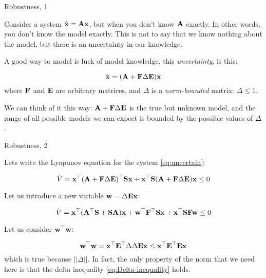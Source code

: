 \documentclass{beamer}
\begin{document}
\begin{frame}{Robustness, 1}
	\begin{flushleft}
		
		Consider a system $\dot{\mathbf{x}} = \mathbf{A}\mathbf{x}$, but when you don't know $\mathbf{A}$ exactly. In other words, you don't know the model exactly. This is not to say that we know nothing about the model, but there is an uncertainty in our knowledge.
		
		\bigskip
		
		A good way to model is luck of model knowledge, this \emph{uncertainty}, is this:
		
		\begin{equation}
			\label{eq:uncertain}
			\dot{\mathbf{x}} = (\mathbf{A} + \mathbf{F} \Delta \mathbf{E})\mathbf{x}
		\end{equation}
		where $\mathbf{F}$ and $\mathbf{E}$ are arbitrary matrices, and $\Delta$ is a \emph{norm-bounded} matrix: $\Delta \leq 1$.
		
		\bigskip
		
		We can think of it this way: $\mathbf{A} + \mathbf{F} \Delta \mathbf{E}$ is the true but unknown model, and the range of all possible models we can expect is bounded by the possible values of $\Delta$.
				
	\end{flushleft}
\end{frame}



\begin{frame}{Robustness, 2}
	\begin{flushleft}
		
		Lets write the Lyapunov equation for the system \eqref{eq:uncertain}:
		
		\begin{equation}
			\dot V = \mathbf{x}^\top 
			(\mathbf{A} + \mathbf{F} \Delta \mathbf{E})^\top\mathbf{S}\mathbf{x} + \mathbf{x}^\top\mathbf{S} (\mathbf{A} + \mathbf{F} \Delta \mathbf{E}) \mathbf{x} \leq 0
		\end{equation}
		
		Let us introduce a new variable $\mathbf{w} = \Delta \mathbf{E}\mathbf{x}$:
		
		\begin{equation}
			\label{eq:Lyapunov_xw}
			\dot V = \mathbf{x}^\top 
			(\mathbf{A}^\top \mathbf{S} + \mathbf{S}\mathbf{A}) \mathbf{x} + 
			\mathbf{w}^\top \mathbf{F}^\top\mathbf{S} \mathbf{x} +
			\mathbf{x}^\top \mathbf{S}\mathbf{F} \mathbf{w} \leq 0
		\end{equation}
		
		Let us consider $\mathbf{w}^\top \mathbf{w}$:
		
		\begin{equation}
			\label{eq:Delta-inequality}
		\mathbf{w}^\top \mathbf{w} = 
		\mathbf{x}^\top\mathbf{E}^\top \Delta \Delta \mathbf{E}\mathbf{x}
		\leq
		\mathbf{x}^\top\mathbf{E}^\top \mathbf{E}\mathbf{x}
		\end{equation}		
		which is true because $|| \Delta ||$. In fact, the only property of the norm that we need here is that the delta inequality \eqref{eq:Delta-inequality} holds.
		
	\end{flushleft}
\end{frame}
\end{document}
